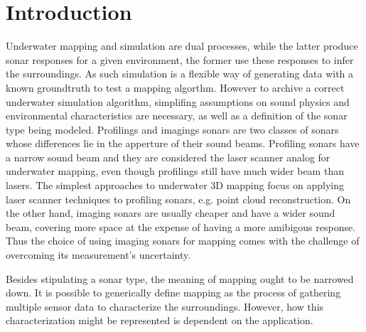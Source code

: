 \chapter{Introduction}


Underwater mapping and simulation are dual processes, while the latter produce
sonar responses for a given environment, the former use these responses to infer
the surroundings. As such simulation is a flexible way of generating data with a
known groundtruth to test a mapping algorthm. However to archive a correct
underwater simulation algorithm, simplifing assumptions on sound physics
and environmental characteristics are necessary, as well as a definition of the
sonar type being modeled.
Profilings and imagings sonars are two classes of sonars whose differences lie
in the apperture of their sound beams. Profiling sonars have a narrow sound beam
and they are considered the laser scanner analog for underwater mapping,
even though profilings still have much wider beam than lasers. The simplest
approaches to underwater 3D mapping focus on applying laser scanner techniques
to profiling sonars, e.g. point cloud reconstruction.
 On the other hand, imaging sonars are usually
cheaper and have a wider sound beam, covering more space at the expense of
having a more amibigous response. Thus the choice of using imaging
sonars for mapping comes with the challenge of overcoming its measurement's
uncertainty.



Besides stipulating a sonar type, the meaning of mapping ought to be narrowed
down. It is possible to generically define mapping as the process of gathering
multiple sensor data to characterize the surroundings. However, how this
characterization might be represented is dependent on the application.

